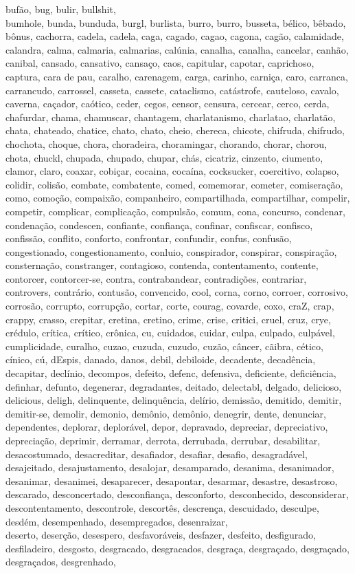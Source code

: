 bufão, bug, bulir, bullshit, \\ bumhole, bunda, bunduda, burgl, burlista, burro, burro, busseta, bélico, bêbado, bônus, cachorra, cadela, cadela, caga, cagado, cagao, cagona, cagão, calamidade, calandra, calma, calmaria, calmarias, calúnia, canalha, canalha, cancelar, canhão, canibal, cansado, cansativo, cansaço, caos, capitular, capotar, caprichoso, captura, cara de pau, caralho, carenagem, carga, carinho, carniça, caro, carranca, carrancudo, carrossel, casseta, cassete, cataclismo, catástrofe, cauteloso, cavalo, caverna, caçador, caótico, ceder, cegos, censor, censura, cercear, cerco, cerda, chafurdar, chama, chamuscar, chantagem, charlatanismo, charlatao, charlatão, chata, chateado, chatice, chato, chato, cheio, chereca, chicote, chifruda, chifrudo, chochota, choque, chora, choradeira, choramingar, chorando, chorar, chorou, chota, chuckl, chupada, chupado, chupar, chás, cicatriz, cinzento, ciumento, clamor, claro, coaxar, cobiçar, cocaina, cocaína, cocksucker, coercitivo, colapso, colidir, colisão, combate, combatente, comed, comemorar, cometer, comiseração, como, comoção, compaixão, companheiro, compartilhada, compartilhar, compelir, competir, complicar, complicação, compulsão, comum, cona, concurso, condenar, condenação, condescen, confiante, confiança, confinar, confiscar, confisco, confissão, conflito, conforto, confrontar, confundir, confus, confusão, congestionado, congestionamento, conluio, conspirador, conspirar, conspiração, consternação, constranger, contagioso, contenda, contentamento, contente, contorcer, contorcer-se, contra, contrabandear,  contradições, contrariar, controvers, contrário, contusão, convencido, cool, corna, corno, corroer, corrosivo, corrosão, corrupto, corrupção, cortar, corte, courag, covarde, coxo, craZ, crap, crappy, crasso, crepitar, cretina, cretino, crime, crise, critici, cruel, cruz, crye, crédulo, crítica, crítico, crônica, cu, cuidados, cuidar, culpa, culpado, culpável, cumplicidade, curalho, cuzao, cuzuda, cuzudo, cuzão, câncer, cãibra, cético, cínico, cú, dEspis, danado, danos, debil, debiloide, decadente, decadência, decapitar, declínio, decompos, defeito, defenc, defensiva, deficiente, deficiência, definhar, defunto, degenerar, degradantes, deitado, delectabl, delgado, delicioso, delicious, deligh, delinquente, delinquência, delírio, demissão, demitido, demitir, demitir-se, demolir, demonio, demônio, demônio, denegrir, dente, denunciar, dependentes, deplorar, deplorável, depor, depravado, depreciar, depreciativo, depreciação, deprimir, derramar, derrota, derrubada, derrubar, desabilitar, desacostumado, desacreditar, desafiador, desafiar, desafio, desagradável, desajeitado, desajustamento, desalojar, desamparado, desanima, desanimador, desanimar, desanimei, desaparecer, desapontar, desarmar, desastre, desastroso, descarado, desconcertado, desconfiança, desconforto, desconhecido, desconsiderar, descontentamento, descontrole, descortês, descrença, descuidado, desculpe, desdém, desempenhado, desempregados, desenraizar, \\ deserto, deserção, desespero, desfavoráveis, desfazer, desfeito, desfigurado, desfiladeiro, desgosto, desgracado, desgracados, desgraça, desgraçado, desgraçado, desgraçados, desgrenhado, 
